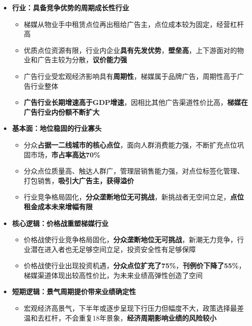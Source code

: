   \begin{itemize}[leftmargin=*]
    \item
      \textbf{行业：具备竞争优势的周期成长性行业}
      {\small
      \begin{itemize}
        \item 梯媒从物业手中租赁点位再出租给广告主，点位成本较为固定，经营杠杆高
        \item 优质点位资源有限，行业内企业\textbf{具有先发优势}，\textbf{壁垒高}，上下游面对的物业和广告主较为分散，\textbf{议价能力强}
        \item 广告行业受宏观经济影响具有\textbf{周期性}，梯媒属于品牌广告，周期性高于广告行业整体
        \item\textbf{ 广告行业长期增速高于GDP增速}，因相比其他广告渠道性价比高，\textbf{梯媒在广告行业内份额不断扩大}
      \end{itemize}
      }
    \item
      \textbf{基本面：地位稳固的行业寡头}
      {\small
      \begin{itemize}
        \item 分众\textbf{占据一二线城市的核心点位}，面向人群消费能力强，不断扩充点位巩固市场，\textbf{市占率高达70\%}
        \item 分众点位质量高、触达人群广，管理层销售能力强，对点位标签化管理、打包销售，\textbf{吸引大广告主，获得溢价}
        \item 行业竞争格局固化，\textbf{分众垄断地位无可挑战}，新挑战者无空间立足，\textbf{点位租金成本未来增幅有限}
      \end{itemize}
      }
      \item
      \textbf{核心逻辑：价格战重塑梯媒行业}
      {\small
      \begin{itemize}
        \item 价格战使行业竞争格局固化，\textbf{分众垄断地位无可挑战}，新潮无力竞争，行业潜在进入者也无足够空间立足，投资安全性有足够保障
        \item 价格战使行业出现投资机遇，\textbf{分众点位扩充了75\%}，\textbf{刊例价下降了55\%}，梯媒渠道体现出较高性价比，为未来业绩高弹性创造了空间
      \end{itemize}
      }
    \item
      \textbf{短期逻辑：景气周期提价带来业绩确定性}
      {\small
      \begin{itemize}
        \item 宏观经济高景气，下半年或逐步呈现下行压力但幅度不大，政策选择最差温和去杠杆，不会重复18年景象，\textbf{经济周期影响业绩的风险较小}

\end{itemize}}
\end{itemize}
